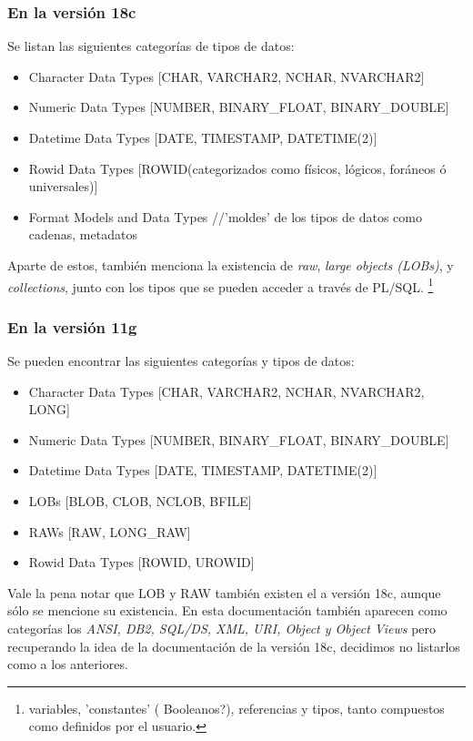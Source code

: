 \documentclass[10pt]{article}
\begin{document}
	\subsubsection{En la versión 18c}
	Se listan las siguientes categorías de tipos de datos:
	\begin{itemize}
	\small
	    \item Character Data Types [CHAR, VARCHAR2, NCHAR, NVARCHAR2]
        \item Numeric Data Types [NUMBER, BINARY\_FLOAT, BINARY\_DOUBLE]
        \item Datetime Data Types [DATE, TIMESTAMP, DATETIME(2)]
        \item Rowid Data Types [ROWID(categorizados como físicos, lógicos, foráneos ó 
              universales)]
        \item Format Models and Data Types //'moldes' de los tipos de datos como cadenas,
              metadatos
    \end{itemize}
	
	Aparte de estos, también menciona la existencia de \textit{raw}, \textit{large objects
	(LOBs)}, y \textit{collections}, junto con los tipos que se pueden acceder a través de 
	PL/SQL. \footnote{variables, 'constantes' ( Booleanos?), referencias y tipos, tanto 
	compuestos como definidos por el usuario.}
	
	\subsubsection{En la versión 11g}
	Se pueden encontrar las siguientes categorías y tipos de datos:
	\begin{itemize}
	\small
	    \item Character Data Types [CHAR, VARCHAR2, NCHAR, NVARCHAR2, LONG]
        \item Numeric Data Types [NUMBER, BINARY\_FLOAT, BINARY\_DOUBLE]
        \item Datetime Data Types [DATE, TIMESTAMP, DATETIME(2)]
        \item LOBs [BLOB, CLOB, NCLOB, BFILE]
        \item RAWs [RAW, LONG\_RAW]
        \item Rowid Data Types [ROWID, UROWID]
    \end{itemize}
	
	Vale la pena notar que LOB y RAW también existen el a versión 18c, aunque sólo se
	mencione su existencia. En esta documentación también aparecen como categorías los 
	\textit{ANSI, DB2, SQL/DS, XML, URI, Object y Object Views} pero recuperando la idea 
	de la documentación de la versión 18c, decidimos no listarlos como a los anteriores.
	
\end{document}
